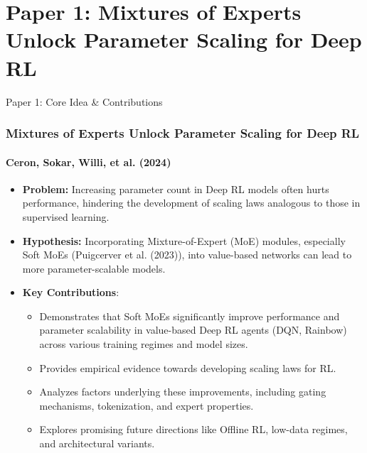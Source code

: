 \documentclass{beamer}
\newcommand{\ceronMoE}{Ceron, Sokar, Willi, et al. (2024)}
\newcommand{\puigcerverSoftMoE}{Puigcerver et al. (2023)}
\begin{document}
\section{Paper 1: Mixtures of Experts Unlock Parameter Scaling for Deep RL}
\begin{frame}{Paper 1: Core Idea & Contributions}
    \frametitle{Mixtures of Experts Unlock Parameter Scaling for Deep RL}
    \framesubtitle{\ceronMoE{}}
  \begin{itemize}
    \item \textbf{Problem:} Increasing parameter count in Deep RL models often hurts performance, hindering the development of scaling laws analogous to those in supervised learning.
    \item \textbf{Hypothesis:} Incorporating Mixture-of-Expert (MoE) modules, especially Soft MoEs (\puigcerverSoftMoE{}), into value-based networks can lead to more parameter-scalable models.
    \item \textbf{Key Contributions}:
    \begin{itemize}
        \item Demonstrates that Soft MoEs significantly improve performance and parameter scalability in value-based Deep RL agents (DQN, Rainbow) across various training regimes and model sizes.
        \item Provides empirical evidence towards developing scaling laws for RL.
        \item Analyzes factors underlying these improvements, including gating mechanisms, tokenization, and expert properties.
        \item Explores promising future directions like Offline RL, low-data regimes, and architectural variants.
    \end{itemize}
  \end{itemize}
\end{frame}
\end{document}
